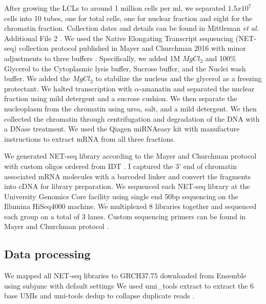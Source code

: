After growing the LCLs to around 1 million cells per ml, we separated $1.5x10^{7}$ cells into 10 tubes, one for total cells, one for nuclear fraction and eight for the chromatin fraction. Collection dates and details can be found in Mittleman \emph{et al.} Additional File 2 \cite{mittleman_alternative_2020}. We used the Native Elongating Transcript sequencing (NET-seq) collection protocol published in Mayer and Churchman 2016 with minor adjustments to three buffers \citep{mayr_evolution_2016}. Specifically, we added 1M $MgCl_{2}$ and 100\% Glycerol to the Cytoplasmic lysis buffer, Sucrose buffer, and the Nuclei wash buffer. We added the $MgCl_{2}$ to stabilize the nucleus and the glycerol as a freezing protectant. We halted transcription with $\alpha$-amanatin and separated the nuclear fraction using mild detergent and a sucrose cushion. We then separate the nucleoplasm from the chromatin using urea, salt, and a mild detergent. We then collected the chromatin through centrifugation and degradation of the DNA with a DNase treatment. We used the Qiagen miRNAeasy kit with manufacture instructions to extract mRNA from all three fractions.


We generated NET-seq library according to the Mayer and Churchman protocol with custom oligos ordered from IDT \citep{mayr_evolution_2016}. I captured the 3' end of chromatin associated mRNA molecules with a barcoded linker and convert the fragments into cDNA for library preparation. We sequenced each NET-seq library at the University Genomics Core facility using single end 50bp sequencing on the Illumina HiSeq4000 machine. We multiplexed 8 libraries together and sequenced each group on a total of 3 lanes. Custom sequencing primers can be found in Mayer and Churchman protocol \citep{mayr_evolution_2016}. 


\subsection{Data processing}\label{Data-processing}



We mapped all NET-seq libraries to GRCH37.75 downloaded from Ensemble using subjunc with default settings \citep{international_human_genome_sequencing_consortium_initial_2001, Liao2013} We used umi\_tools extract to extract the 6 base UMIs and umi-tools dedup to collapse duplicate reads \citep{smith_umi-tools_2017}. 
 
